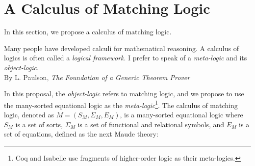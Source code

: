 \documentclass[UTF8]{article}
\theoremstyle{plain}
\theoremstyle{definition}
\theoremstyle{remark}
\begin{document}
\section{A Calculus of Matching Logic}
In this section, we propose a calculus of matching logic.
\begin{displayquote}
	Many people have developed calculi for mathematical reasoning. 
	A calculus of logics is often called a \emph{logical framework}.
	I prefer to speak of a \emph{meta-logic} and its \emph{object-logic}. \\
	By L. Paulson, \emph{The Foundation of a Generic Theorem Prover}
\end{displayquote}
In this proposal, the \emph{object-logic} refers to matching logic,
and we propose to use the many-sorted equational logic as the 
\emph{meta-logic}\footnote{Coq and Isabelle use 
fragments of higher-order logic as their meta-logics.}. 
The calculus of matching logic, denoted as $M = (S_M, \Sigma_M, E_M)$, is a 
many-sorted equational logic
where $S_M$ is a set of sorts, $\Sigma_M$ is a set of functional and relational 
symbols, and $E_M$ is a set of equations, defined as the next Maude theory:
\end{document}
